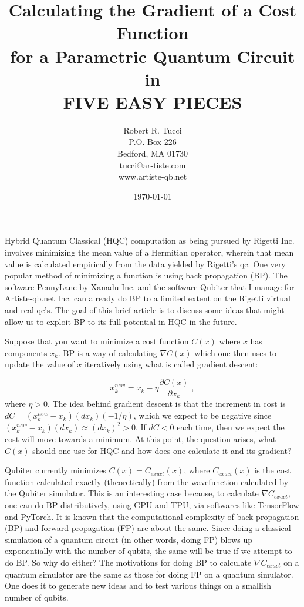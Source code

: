 \documentclass[12pt]{article}
\newcommand{\beq}{\begin{equation}}
\newcommand{\eeq}{\end{equation}}
\begin{document}
\title{Calculating the Gradient of a Cost Function\\
 for a Parametric Quantum Circuit in\\
 FIVE EASY PIECES}


\author{Robert R. Tucci\\
        P.O. Box 226\\
        Bedford,  MA   01730\\
        tucci@ar-tiste.com\\
        www.artiste-qb.net}


\date{\today}
\maketitle
\vskip2cm

Hybrid Quantum Classical (HQC) computation
as being pursued by Rigetti Inc. involves
minimizing the mean value of a Hermitian operator,
wherein that mean value is calculated empirically from
the data yielded by Rigetti's qc.
One very popular method of minimizing
a function is using back propagation (BP).
The software PennyLane by Xanadu Inc. and the software
Qubiter that I manage for Artiste-qb.net Inc.
can already do BP
to a limited extent
on the Rigetti virtual and real qc's.
The goal of this brief article is to
discuss some ideas
that might allow us
to exploit BP
to its full potential in HQC in the future.

Suppose that you want to  minimize a cost function
$C(x)$ where $x$ has components $x_k$. BP is a way of calculating
$\nabla C(x)$ which one then uses to update
 the value of $x$ iteratively
using what is called gradient descent:

\beq
x^{new}_k = x_k - \eta\frac{\partial C(x)}{\partial x_k}
\;,
\eeq
where $\eta>0$.
The idea behind gradient descent is
 that the increment in cost is
$dC= (x^{new}_k-x_k)(dx_k)(-1/\eta)$,
which we expect to be negative
since $(x^{new}_k-x_k)(dx_k)\approx (dx_k)^2>0$.
If $dC<0$ each time, then we expect the cost will
 move towards a minimum.
At this point, the question arises,
what $C(x)$ should one use for HQC and how
does one calculate it
and its gradient?

Qubiter currently minimizes $C(x)=C_{exact}(x)$,
where $C_{exact}(x)$ is the cost function
calculated exactly (theoretically)
from the wavefunction calculated
by the Qubiter simulator. This
is an interesting case because,
to calculate $\nabla C_{exact}$,
one can do BP distributively, using GPU and TPU,
via softwares like TensorFlow and PyTorch.
It is known that the computational
complexity of back propagation (BP) and forward
propagation (FP) are about the same.
Since doing a classical simulation
of a quantum circuit (in other words, doing FP)
blows up exponentially with the number of qubits,
the same will be true if we attempt to do BP.
So why do either?
The motivations for doing BP
to calculate $\nabla C_{exact}$
on a quantum simulator are the same as those
for doing FP on a quantum simulator.
One does it to generate new ideas and
to test various things
on a smallish number of qubits.
\end{document}

